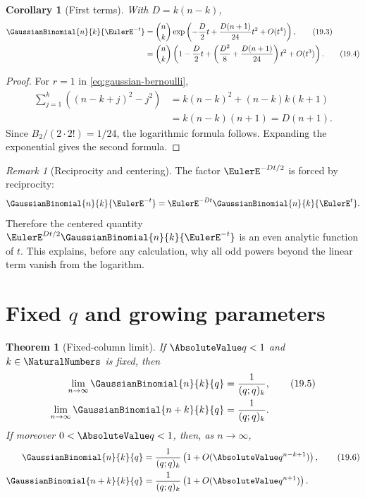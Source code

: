 \documentclass[11pt,a4paper,oneside,openany]{book}
\newtheorem{theorem}{Theorem}[chapter]
\newtheorem{corollary}[corollary]{Corollary}
\theoremstyle{definition}
\theoremstyle{remark}
\newtheorem{remark}[remark]{Remark}
\begin{document}

\begin{corollary}[First terms]\label{cor:gaussian-first-asymptotic}
With $D=k(n-k)$,
\begin{align}
 \GaussianBinomial{n}{k}{\EulerE^{-t}}
 &=\binom nk
 \exp\left(
 -\frac D2t+\frac{D(n+1)}{24}t^2+O(t^4)
 \right),
 \tag{19.3}\label{eq:gaussian-first-asymptotic}\\
 &=\binom nk\left(
 1-\frac D2t+
 \left(\frac{D^2}{8}+\frac{D(n+1)}{24}\right)t^2
 +O(t^3)
 \right).
 \tag{19.4}\label{eq:gaussian-first-expanded}
\end{align}
\end{corollary}

\begin{proof}
For $r=1$ in \eqref{eq:gaussian-bernoulli},
\begin{align*}
 \sum_{j=1}^{k}\left((n-k+j)^2-j^2\right)
 &=k(n-k)^2+(n-k)k(k+1)\\
 &=k(n-k)(n+1)=D(n+1).
\end{align*}
Since $B_2/(2\cdot2!)=1/24$, the logarithmic formula follows.  Expanding the exponential gives the second formula.
\end{proof}

\begin{remark}[Reciprocity and centering]
The factor $\EulerE^{-Dt/2}$ is forced by reciprocity:
\[
 \GaussianBinomial{n}{k}{\EulerE^{-t}}
 =\EulerE^{-Dt}\GaussianBinomial{n}{k}{\EulerE^t}.
\]
Therefore the centered quantity $\EulerE^{Dt/2}\GaussianBinomial{n}{k}{\EulerE^{-t}}$ is an even analytic function of $t$.  This explains, before any calculation, why all odd powers beyond the linear term vanish from the logarithm.
\end{remark}

\section{Fixed \texorpdfstring{$q$}{q} and growing parameters}

\begin{theorem}[Fixed-column limit]\label{thm:fixed-column-limit}
If $\AbsoluteValue q<1$ and $k\in\NaturalNumbers$ is fixed, then
\begin{align}
 \lim_{n\to\infty}\GaussianBinomial{n}{k}{q}
 &=\frac1{(q;q)_k},
 \tag{19.5}\label{eq:fixed-column-limit}\\
 \lim_{n\to\infty}\GaussianBinomial{n+k}{k}{q}
 &=\frac1{(q;q)_k}.
 \label{eq:fixed-column-shifted-limit}
\end{align}
If moreover $0<\AbsoluteValue q<1$, then, as $n\to\infty$,
\begin{align}
 \GaussianBinomial{n}{k}{q}
 &=\frac1{(q;q)_k}\left(1+O(\AbsoluteValue q^{n-k+1})\right),
 \tag{19.6}\label{eq:fixed-column-error}\\
 \GaussianBinomial{n+k}{k}{q}
 &=\frac1{(q;q)_k}\left(1+O(\AbsoluteValue q^{n+1})\right).
 \label{eq:fixed-column-shifted-error}
\end{align}
\end{theorem}
\end{document}
